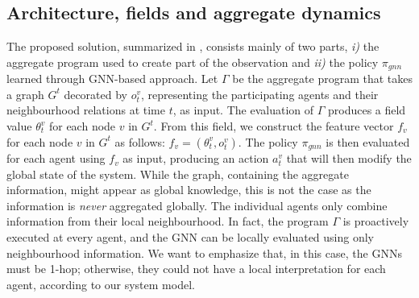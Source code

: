 \subsection{Architecture, fields and aggregate dynamics}
The proposed solution, summarized in , consists mainly of two parts, 
\emph{i)} the aggregate program used to create part of the observation and 
\emph{ii)} the policy $\pi_{gnn}$ learned through \ac{GNN}-based approach. 
%
Let $\Gamma$ be the aggregate program that takes a graph $G^t$ decorated by $o^v_t$, 
 representing the participating agents and their neighbourhood relations at time $t$, as input. 
%
The evaluation of $\Gamma$ produces a field value $\theta^v_t$ for each node $v$ in $G^t$. 
From this field, we construct the feature vector $f_v$ for each node $v$ in $G^t$ as follows:
 $f_v = (\theta^v_t, o^v_t)$.
%
The policy $\pi_{gnn}$ is then evaluated for each agent using $f_v$ as input, 
 producing an action $a^v_t$ that will then modify the global state of the system.
%
While the graph, containing the aggregate information, 
 might appear as global knowledge, 
 this is not the case as the information is \emph{never} aggregated globally. 
The individual agents only combine information from their local neighbourhood.
%
In fact, the program $\Gamma$ is proactively executed at every agent, 
and the \ac{GNN} can be locally evaluated using only neighbourhood information. 
%
We want to emphasize that, in this case, the \acp{GNN} must be 1-hop; 
otherwise, they could not have a local interpretation for each agent, according to our system model.
